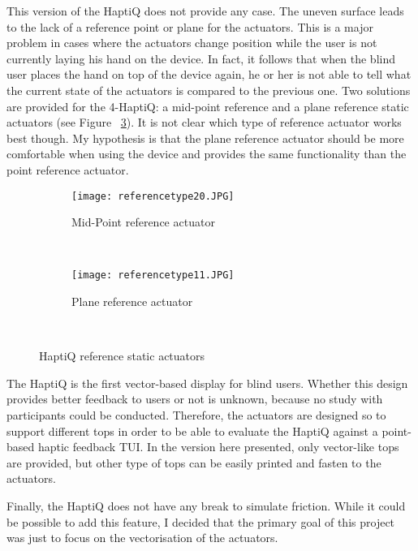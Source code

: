 This version of the HaptiQ does not provide any case. The uneven surface leads to the lack of a reference point or plane for the actuators. This is a major problem in cases where the actuators change position while the user is not currently laying his hand on the device. In fact, it follows that when the blind user places the hand on top of the device again, he or her is not able to tell what the current state of the actuators is compared to the previous one. Two solutions are provided for the 4-HaptiQ: a mid-point reference and a plane reference static actuators (see Figure ~\ref{fig:HaptiQ reference static actuators}). It is not clear which type of reference actuator works best though. My hypothesis is that the plane reference actuator should be more comfortable when using the device and provides the same functionality than the point reference actuator. 

\begin{figure}
        \centering
        \begin{subfigure}[H]{0.5\textwidth}
                \texttt{[image: referencetype20.JPG]}
                \caption{Mid-Point reference actuator}
                \label{fig:Mid-Point reference actuator}
        \end{subfigure}%
        ~ %
        \begin{subfigure}[H]{0.5\textwidth}
                \texttt{[image: referencetype11.JPG]}
                \caption{Plane reference actuator}
                \label{fig:Plane reference actuator}
        \end{subfigure}
        ~ %
        \caption{HaptiQ reference static actuators}\label{fig:HaptiQ reference static actuators}
\end{figure}

The HaptiQ is the first vector-based display for blind users. Whether this design provides better feedback to users or not is unknown, because no study with participants could be conducted. Therefore, the actuators are designed so to support different tops in order to be able to evaluate the HaptiQ against a point-based haptic feedback TUI. In the version here presented, only vector-like tops are provided, but other type of tops can be easily printed and fasten to the actuators.   

Finally, the HaptiQ does not have any break to simulate friction. While it could be possible to add this feature, I decided that the primary goal of this project was just to focus on the vectorisation of the actuators. 

